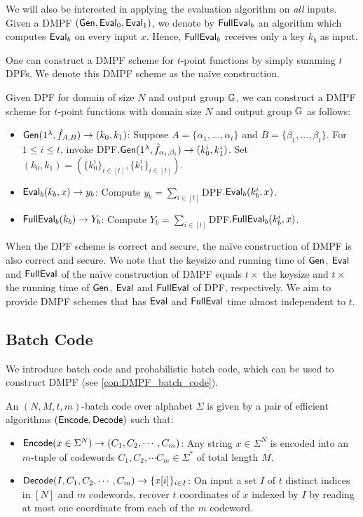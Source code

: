  We will also be interested in applying the evaluation algorithm on \emph{all} inputs. Given a DMPF $({\sf Gen},{\sf Eval}_0,{\sf Eval}_1)$, we denote by ${\sf FullEval}_b$ an algorithm which computes ${\sf Eval}_b$ on every input $x$. Hence, ${\sf FullEval}_b$ receives only a key $k_b$ as input.

 One can construct a DMPF scheme for $t$-point functions by simply summing $t$ DPFs. We denote this DMPF scheme as the na\"ive construction. 
\begin{construction}
  Given DPF for domain of size $N$ and output group $\mathbb{G}$, we can construct a DMPF scheme for $t$-point functions with domain size $N$ and output group $\mathbb{G}$ as follows: 
  \begin{itemize}
    \item ${\sf Gen}(1^\lambda, \hat{f}_{A, B})\rightarrow (k_0, k_1)$: Suppose $A = \{\alpha_1,\dots, \alpha_t\}$ and $B = \{\beta_1,\dots, \beta_t\}$. For $1\le i\le t$, invoke DPF$.{\sf Gen}(1^\lambda, \hat{f}_{\alpha_i, \beta_i})\rightarrow (k_0^i, k_1^i)$. Set $(k_0, k_1) = (\{k_0^i\}_{i\in [t]}, \{k_1^i\}_{i\in [t]})$. 
    \item ${\sf Eval}_b(k_b, x)\rightarrow y_b$: Compute $y_b = \sum_{i\in [t]}$DPF$.{\sf Eval}_b(k_b^i, x)$. 
    \item ${\sf FullEval}_b(k_b)\rightarrow Y_b$: Compute $Y_b = \sum_{i\in [t]}$DPF$.{\sf FullEval}_b(k_b^i, x)$. 
  \end{itemize}
\end{construction}
When the DPF scheme is correct and secure, the na\"ive construction of DMPF is also correct and secure. We note that the keysize and running time of ${\sf Gen}$, ${\sf Eval}$ and ${\sf FullEval}$ of the na\"ive construction of DMPF equals $t\times $ the keysize and $t\times$ the running time of ${\sf Gen}$, ${\sf Eval}$ and ${\sf FullEval}$ of DPF, respectively. We aim to provide DMPF schemes that has ${\sf Eval}$ and ${\sf FullEval}$ time almost independent to $t$. 
 
 

\subsection{Batch Code}
We introduce batch code and probabilistic batch code, which can be used to construct DMPF (see \cref{con:DMPF_batch_code}). 
\begin{definition}
  An $(N,M,t,m)$-batch code over alphabet $\Sigma$ is given by a pair of efficient algorithms $({\sf Encode},{\sf Decode})$ such that:
  \begin{itemize}
    \item ${\sf Encode}(x\in\Sigma^N)\rightarrow (C_1,C_2,\cdots,C_m)$: Any string $x\in\Sigma^N$ is encoded into an $m$-tuple of codewords $C_1,C_2,\cdots C_m\in\Sigma^*$ of total length $M$.
    \item ${\sf Decode}(I,C_1,C_2,\cdots,C_m)\rightarrow \{x[i]\}_{i\in I}$: On input a set $I$ of $t$ distinct indices in $[N]$ and $m$ codewords, recover $t$ coordinates of $x$ indexed by $I$ by reading at most one coordinate from each of the $m$ codeword. 
  \end{itemize}
\end{definition}

